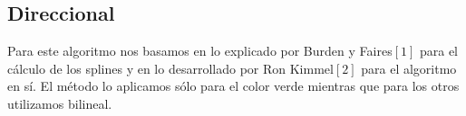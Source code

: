




\newpage
\subsection{Direccional}

Para este algoritmo nos basamos en lo explicado por Burden y Faires$[1]$ para el cálculo de los splines y en lo desarrollado por Ron Kimmel$[2]$ para el algoritmo en sí. El método lo aplicamos sólo para el color verde mientras que para los otros utilizamos bilineal. 

